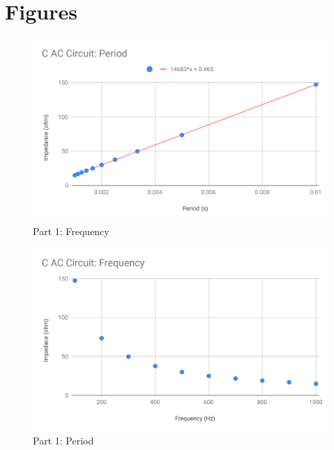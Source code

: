 \section{Figures}
\begin{figure}[ht]
	\centering
	\includegraphics[scale=0.74]{image/06-RLC/part-1-f.pdf}
	\caption{Part 1: Frequency}
	\label{figure.06.part.1.f}
\end{figure}
\begin{figure}[ht]
	\centering
	\includegraphics[scale=0.74]{image/06-RLC/part-1-T.pdf}
	\caption{Part 1: Period}
	\label{figure.06.part.1.T}
\end{figure}
